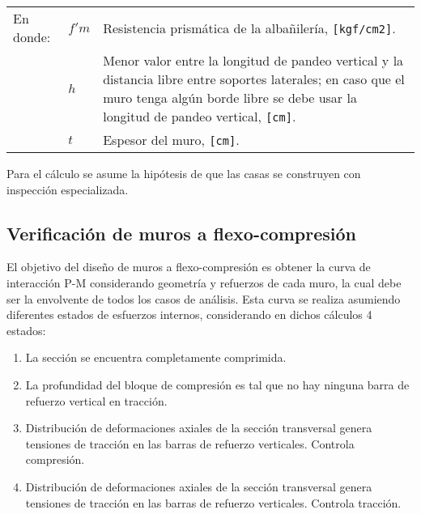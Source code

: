 \vspace{-0.4cm}
\begin{table}[H]
	\centering
	\begin{tabular}{lp{1cm}p{9.0cm}}
		En donde:	& $f'm$ & Resistencia prismática de la albañilería, \texttt{[kgf/cm2]}.\\
		& $h$ & Menor valor entre la longitud de pandeo vertical y la distancia libre entre soportes laterales; en caso que el muro tenga algún borde libre se debe usar la longitud de pandeo vertical, \texttt{[cm]}.\\
		& $t$ & Espesor del muro, \texttt{[cm]}.\\
	\end{tabular}
\end{table}

Para el cálculo se asume la hipótesis de que las casas se construyen con inspección especializada.

\subsection{Verificación de muros a flexo-compresión}

El objetivo del diseño de muros a flexo-compresión es obtener la curva de interacción P-M considerando geometría y refuerzos de cada muro, la cual debe ser la envolvente de todos los casos de análisis. Esta curva se realiza asumiendo diferentes estados de esfuerzos internos, considerando en dichos cálculos 4 estados:

\begin{enumerate}
    \item La sección se encuentra completamente comprimida.
    \item La profundidad del bloque de compresión es tal que no hay ninguna barra de refuerzo vertical en tracción.
    \item Distribución de deformaciones axiales de la sección transversal genera tensiones de tracción en las barras de refuerzo verticales. Controla compresión.
    \item Distribución de deformaciones axiales de la sección transversal genera tensiones de tracción en las barras de refuerzo verticales. Controla tracción.
\end{enumerate}

